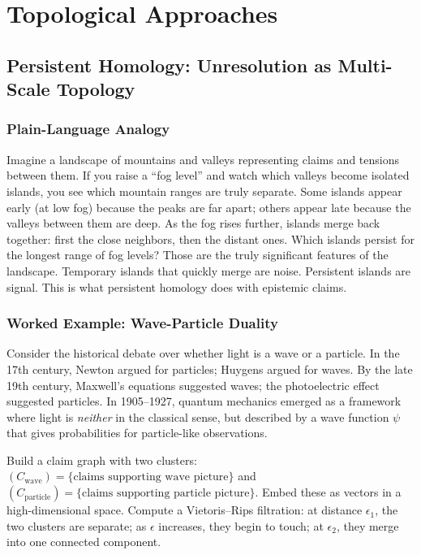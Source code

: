 \documentclass[11pt,letterpaper]{article}
\theoremstyle{definition}
\theoremstyle{remark}
\begin{document}
\newpage

\section{Topological Approaches}
\label{sec:topological}

\subsection{Persistent Homology: Unresolution as Multi-Scale Topology}
\label{sec:persistent}

\subsubsection*{Plain-Language Analogy}

Imagine a landscape of mountains and valleys representing claims and tensions between them. If you raise a ``fog level'' and watch which valleys become isolated islands, you see which mountain ranges are truly separate. Some islands appear early (at low fog) because the peaks are far apart; others appear late because the valleys between them are deep. As the fog rises further, islands merge back together: first the close neighbors, then the distant ones. Which islands persist for the longest range of fog levels? Those are the truly significant features of the landscape. Temporary islands that quickly merge are noise. Persistent islands are signal. This is what persistent homology does with epistemic claims.

\subsubsection*{Worked Example: Wave-Particle Duality}

Consider the historical debate over whether light is a wave or a particle. In the 17th century, Newton argued for particles; Huygens argued for waves. By the late 19th century, Maxwell's equations suggested waves; the photoelectric effect suggested particles. In 1905--1927, quantum mechanics emerged as a framework where light is \emph{neither} in the classical sense, but described by a wave function $\psi$ that gives probabilities for particle-like observations.

Build a claim graph with two clusters: $(C_{\text{wave}}) = \{\text{claims supporting wave picture}\}$ and $(C_{\text{particle}}) = \{\text{claims supporting particle picture}\}$. Embed these as vectors in a high-dimensional space. Compute a Vietoris--Rips filtration: at distance $\epsilon_1$, the two clusters are separate; as $\epsilon$ increases, they begin to touch; at $\epsilon_2$, they merge into one connected component.
\end{document}
